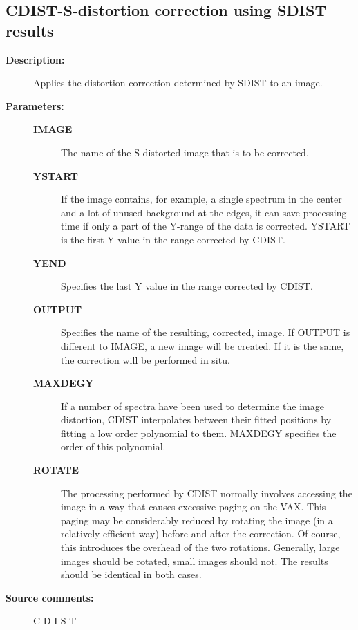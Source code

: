 \subsection{CDIST-\label{CDIST}S-distortion correction using SDIST results}
\begin{description}

\item [\textbf{Description:}]
 Applies the distortion correction determined by SDIST to an image.

\item [\textbf{Parameters:}]
\begin{description}
\item [\textbf{IMAGE}]
 The name of the S-distorted image that is to be corrected.
\item [\textbf{YSTART}]
 If the image contains, for example, a single spectrum
 in the center and a lot of unused background at the
 edges, it can save processing time if only a part of
 the Y-range of the data is corrected.  YSTART is the
 first Y value in the range corrected by CDIST.
\item [\textbf{YEND}]
 Specifies the last Y value in the range corrected by CDIST.
\item [\textbf{OUTPUT}]
 Specifies the name of the resulting, corrected, image.
 If OUTPUT is different to IMAGE, a new image will be created.
 If it is the same, the correction will be performed in situ.
\item [\textbf{MAXDEGY}]
 If a number of spectra have been used to determine the
 image distortion, CDIST interpolates between their
 fitted positions by fitting a low order polynomial to
 them.  MAXDEGY specifies the order of this polynomial.
\item [\textbf{ROTATE}]
 The processing performed by CDIST normally involves
 accessing the image in a way that causes excessive
 paging on the VAX.  This paging may be considerably
 reduced by rotating the image (in a relatively efficient
 way) before and after the correction.  Of course, this
 introduces the overhead of the two rotations.  Generally,
 large images should be rotated, small images should not.
 The results should be identical in both cases.
\end{description}

\item [\textbf{Source comments:}]
\begin{terminalv}
 C D I S T


\end{terminalv}
\end{description}
